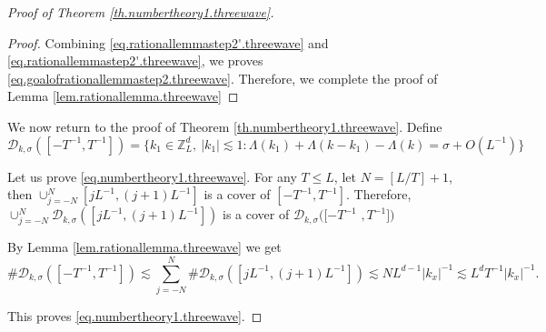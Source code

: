 \begin{proof}[Proof of Theorem \ref{th.numbertheory1.threewave}]
\begin{proof}
Combining \eqref{eq.rationallemmastep2'.threewave} and \eqref{eq.rationallemmastep2'.threewave}, we proves \eqref{eq.goalofrationallemmastep2.threewave}. Therefore, we complete the proof of Lemma \ref{lem.rationallemma.threewave}
\end{proof}

We now return to the proof of Theorem \ref{th.numbertheory1.threewave}. Define 
\begin{equation}
    \mathcal{D}_{k,\sigma}([-T^{-1},T^{-1} ])=\{k_1\in\mathbb{Z}^d_L,\ |k_1|\lesssim 1:\Lambda(k_1)+\Lambda(k-k_1)-\Lambda(k)=\sigma+O(L^{-1})\}
\end{equation}


Let us prove \eqref{eq.numbertheory1.threewave}. For any $T\le L$, let $N=[L/T]+1$, then $\cup_{j=-N}^N [jL^{-1}, (j+1)L^{-1}]$ is a cover of $[-T^{-1}, T^{-1}]$. Therefore, $\cup_{j=-N}^N\mathcal{D}_{k,\sigma}([jL^{-1}, (j+1)L^{-1}])$ is a cover of $\mathcal{D}_{k,\sigma}([-T^{-1}$ $,T^{-1} ])$

By Lemma \ref{lem.rationallemma.threewave} we get 
\begin{equation}\label{eq.thrationalexpand.threewave}
    \#\mathcal{D}_{k,\sigma}([-T^{-1},T^{-1} ])\lesssim \sum_{j=-N}^N\#\mathcal{D}_{k,\sigma}([jL^{-1}, (j+1)L^{-1}])\lesssim NL^{d-1} |k_x|^{-1}\lesssim L^dT^{-1}|k_x|^{-1}.
\end{equation}

This proves \eqref{eq.numbertheory1.threewave}.
\end{proof}


